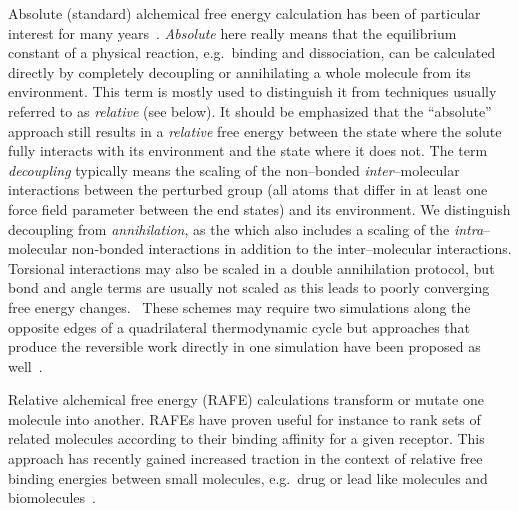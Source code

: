 \documentclass[journal=jctcce,manuscript=article]{achemso}
\begin{document}
Absolute (standard) alchemical free energy calculation has been of 
particular interest for many years~\cite{GILSON19971047,
  doi:10.1021/jp0217839, deng_computations_2009, ytreberg_comparison_2006, doi:10.1021/ct500964e, jorgensen1988efficient}.  \emph{Absolute}
here really means that the equilibrium constant of a physical
reaction, e.g.\ binding and dissociation, can be calculated directly
by completely decoupling or annihilating a whole molecule from its environment. 
This term is mostly used to distinguish it from techniques usually 
referred to as \emph{relative} (see below).  It should be emphasized that the 
``absolute'' approach still results in a \emph{relative} free energy  
between the state where the solute fully interacts with its environment and the state where it does 
not.  The term \emph{decoupling} typically means the scaling of the non--bonded 
\emph{inter}--molecular interactions between the perturbed group (all atoms 
that differ in at least one force field parameter between the end states) and 
its environment.  We distinguish decoupling from \emph{annihilation}, as the which also includes a scaling of
the \emph{intra}--molecular non-bonded interactions in addition to the 
inter--molecular interactions. Torsional interactions may also be scaled in a double annihilation protocol, but bond and angle terms are usually not scaled as this leads to poorly converging free energy changes.~\cite{doi:10.1021/jp981628n}
These schemes may require two 
simulations along the opposite edges of a quadrilateral thermodynamic cycle 
but approaches that produce the reversible work directly in one simulation
have been proposed as well~\cite{doi:10.1063/1.3519057, C3FD00125C}.

Relative alchemical free energy (RAFE) calculations transform or mutate one molecule into 
another.  RAFEs have proven useful for instance to rank sets of related 
molecules according to their binding affinity for a given receptor.  This 
approach has recently gained increased traction in the context of relative free 
binding energies between small molecules, e.g.\ drug or lead like molecules and 
biomolecules~\cite{doi:10.1021/ja512751q, doi:10.1021/acs.jctc.6b00991}.
\end{document}
